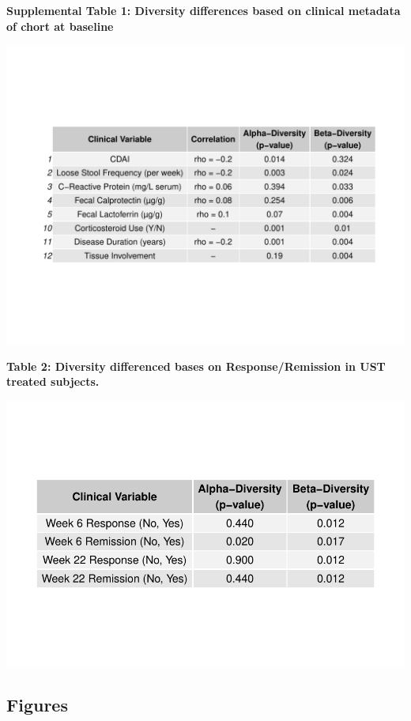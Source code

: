 \documentclass[11pt,]{article}
\begin{document}
\newpage

\textbf{Supplemental Table 1: Diversity differences based on clinical
metadata of chort at baseline}

\includegraphics{tables/table1_cohortdiversity.pdf}

\newpage

\textbf{Table 2: Diversity differenced bases on Response/Remission in
UST treated subjects.}

\includegraphics{tables/table2diversity.pdf}

\newpage

\subsection{Figures}\label{figures}
\end{document}
